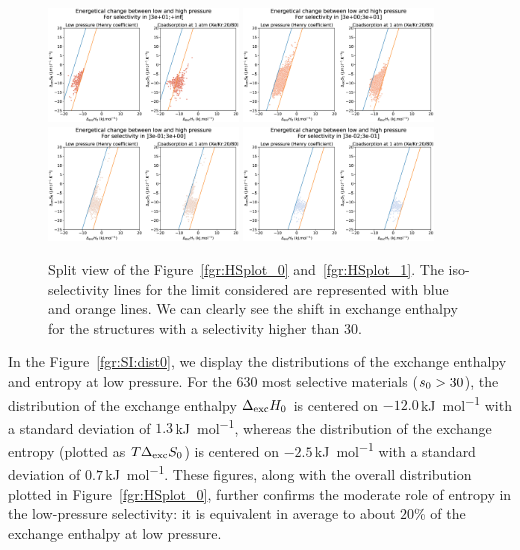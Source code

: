 \documentclass[main.tex]{subfiles}
\begin{document}
\begin{figure}[h]
  \centering
    \includegraphics[width=0.45\textwidth]{figures/2-thermo/H_S_0.jpg}
    \includegraphics[width=0.45\textwidth]{figures/2-thermo/H_S_1.jpg}
    \includegraphics[width=0.45\textwidth]{figures/2-thermo/H_S_2.jpg}
    \includegraphics[width=0.45\textwidth]{figures/2-thermo/H_S_3.jpg}
    \caption{Split view of the Figure~\ref{fgr:HSplot_0} and~\ref{fgr:HSplot_1}. The iso-selectivity lines for the limit considered are represented with blue and orange lines. We can clearly see the shift in exchange enthalpy for the structures with a selectivity higher than $30$.}\label{fgr:SI:HS_split}
\end{figure}


In the Figure~\ref{fgr:SI:dist0}, we display the distributions of the exchange enthalpy and entropy at low pressure. For the 630 most selective materials ($s_{\text{0}} > 30$), the distribution of the exchange enthalpy $\Delta_{\text{exc}}H_{\text{0}}$ is centered on $-12.0$\,\si{\kilo\joule\per\mol} with a standard deviation of $1.3$\,\si{\kilo\joule\per\mol}, whereas the distribution of the exchange entropy (plotted as $T\Delta_{\text{exc}}S_{\text{0}}$) is centered on $-2.5$\,\si{\kilo\joule\per\mol} with a standard deviation of $0.7$\,\si{\kilo\joule\per\mol}. These figures, along with the overall distribution plotted in Figure~\ref{fgr:HSplot_0}, further confirms the moderate role of entropy in the low-pressure selectivity: it is equivalent in average to about {$20$\%} of the exchange enthalpy at low pressure.
\end{document}
